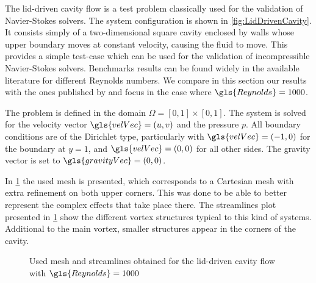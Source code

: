 The lid-driven cavity flow is a test problem classically used for the validation of Navier-Stokes solvers. The system configuration is shown in \cref{fig:LidDrivenCavity}. It consists simply of a two-dimensional square cavity  enclosed by walls whose upper boundary moves at constant velocity, causing the fluid to move. This provides a simple test-case which can be used for the validation of incompressible Navier-Stokes solvers. Benchmarks results can be found widely in the available literature for different Reynolds numbers. We compare in this section our results with the ones published by \cite{botellaBenchmarkSpectralResults1998} and focus in the case where $\gls{Reynolds} = 1000$. 

The problem is defined in the domain $\Omega = [0,1]\times [0,1]$. The system is solved for the velocity vector $\gls{velVec} = (u,v)$ and the pressure $p$. All boundary conditions are of the Dirichlet type, particularly with $\gls{velVec} = (-1,0)$ for the boundary at $y = 1$, and $\gls{velVec} = (0,0)$ for all other sides. The gravity vector is set to $\gls{gravityVec} = (0,0)$. 

 In \cref{fig:LiddrivenMesh} the used mesh is presented, which corresponds to a Cartesian mesh with extra refinement on both upper corners. This was done to be able to better represent the complex effects that take place there.  The streamlines plot presented in \cref{fig:LiddrivenMesh} show the different vortex structures typical to this kind of systems. Additional to the main vortex, smaller structures appear in the corners of the cavity. 
	
	\begin{figure}[t]
		\centering
		\pgfplotsset{width=0.35 \textwidth, compat=1.3}	
		\caption{Used mesh and streamlines obtained for the lid-driven cavity flow with $\gls{Reynolds} = 1000$} \label{fig:LiddrivenMesh}
	\end{figure}


